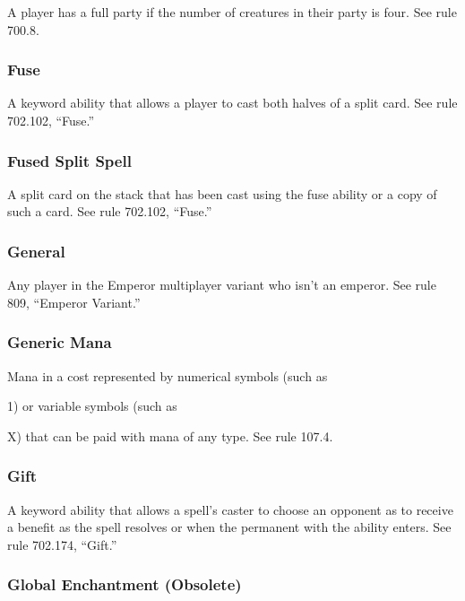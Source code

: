 {{{{{{{{{{{{{A player has a full party if the number of creatures in their party is four. See rule 700.8.

\subsubsection*{Fuse}

A keyword ability that allows a player to cast both halves of a split card. See rule 702.102, “Fuse.”

\subsubsection*{Fused Split Spell}

A split card on the stack that has been cast using the fuse ability or a copy of such a card. See rule 702.102, “Fuse.”

\subsubsection*{General}

Any player in the Emperor multiplayer variant who isn’t an emperor. See rule 809, “Emperor Variant.”

\subsubsection*{Generic Mana}

Mana in a cost represented by numerical symbols (such as {1) or variable symbols (such as {X) that can be paid with mana of any type. See rule 107.4.

\subsubsection*{Gift}

A keyword ability that allows a spell’s caster to choose an opponent as to receive a benefit as the spell resolves or when the permanent with the ability enters. See rule 702.174, “Gift.”

\subsubsection*{Global Enchantment (Obsolete)}

}}}}}}}}}}}}}}}
